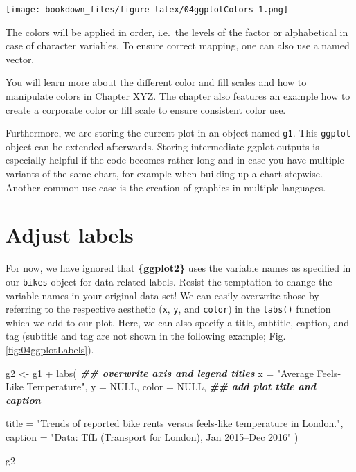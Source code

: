 \documentclass[
]{krantz}
\makeatletter
\newenvironment{Shaded}{\begin{snugshade}}{\end{snugshade}}
\newcommand{\AttributeTok}[1]{\textcolor[rgb]{0.61,0.61,0.61}{#1}}
\newcommand{\ConstantTok}[1]{\textcolor[rgb]{0,0,0}{#1}}
\newcommand{\DocumentationTok}[1]{\textcolor[rgb]{0.37,0.37,0.37}{\textbf{\textit{#1}}}}
\newcommand{\FunctionTok}[1]{\textcolor[rgb]{0,0,0}{#1}}
\newcommand{\NormalTok}[1]{#1}
\newcommand{\OtherTok}[1]{\textcolor[rgb]{0.37,0.37,0.37}{#1}}
\newcommand{\SpecialCharTok}[1]{\textcolor[rgb]{0,0,0}{#1}}
\newcommand{\StringTok}[1]{\textcolor[rgb]{0.5,0.5,0.5}{#1}}
\newenvironment{kframe}{%
\medskip{}
\setlength{\fboxsep}{.8em}
 \def\at@end@of@kframe{}%
 \ifinner\ifhmode%
  \def\at@end@of@kframe{\end{minipage}}%
  \begin{minipage}{\columnwidth}%
 \fi\fi%
 \def\FrameCommand##1{\hskip\@totalleftmargin \hskip-\fboxsep
 \colorbox{shadecolor}{##1}\hskip-\fboxsep
     \hskip-\linewidth \hskip-\@totalleftmargin \hskip\columnwidth}%
 \MakeFramed {\advance\hsize-\width
   \@totalleftmargin\z@ \linewidth\hsize
   \@setminipage}}%
 {\par\unskip\endMakeFramed%
 \at@end@of@kframe}
\renewenvironment{Shaded}{\begin{kframe}}{\end{kframe}}
\makeatother
\begin{document}
\texttt{[image: bookdown\_files/figure-latex/04ggplotColors-1.png]}

The colors will be applied in order, i.e.~the levels of the factor or alphabetical in case of character variables. To ensure correct mapping, one can also use a named vector.

You will learn more about the different color and fill scales and how to manipulate colors in Chapter XYZ. The chapter also features an example how to create a corporate color or fill scale to ensure consistent color use.

Furthermore, we are storing the current plot in an object named \texttt{g1}. This \texttt{ggplot} object can be extended afterwards. Storing intermediate ggplot outputs is especially helpful if the code becomes rather long and in case you have multiple variants of the same chart, for example when building up a chart stepwise. Another common use case is the creation of graphics in multiple languages.

\hypertarget{label-adjustment}{%
\section{Adjust labels}\label{label-adjustment}}

For now, we have ignored that \textbf{\{ggplot2\}} uses the variable names as specified in our \texttt{bikes} object for data-related labels. Resist the temptation to change the variable names in your original data set! We can easily overwrite those by referring to the respective aesthetic (\texttt{x}, \texttt{y}, and \texttt{color}) in the \texttt{labs()} function which we add to our plot. Here, we can also specify a title, subtitle, caption, and tag (subtitle and tag are not shown in the following example; Fig. \ref{fig:04ggplotLabels}).

\begin{Shaded}
\begin{Highlighting}[]
\NormalTok{g2 }\OtherTok{\textless{}{-}}\NormalTok{ g1 }\SpecialCharTok{+}
  \FunctionTok{labs}\NormalTok{(}
    \DocumentationTok{\#\# overwrite axis and legend titles}
    \AttributeTok{x =} \StringTok{"Average Feels{-}Like Temperature"}\NormalTok{, }\AttributeTok{y =} \ConstantTok{NULL}\NormalTok{, }\AttributeTok{color =} \ConstantTok{NULL}\NormalTok{,}
    \DocumentationTok{\#\# add plot title and caption}
    
    \AttributeTok{title =} \StringTok{"Trends of reported bike rents versus feels{-}like temperature in London."}\NormalTok{,}
    \AttributeTok{caption =} \StringTok{"Data: TfL (Transport for London), Jan 2015–Dec 2016"}
\NormalTok{  )}

\NormalTok{g2}
\end{Highlighting}
\end{Shaded}
\end{document}
